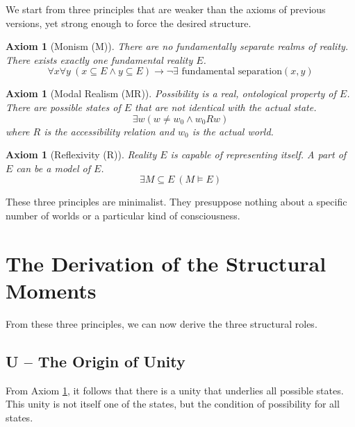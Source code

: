 \documentclass[12pt,a4paper]{article}
\newtheorem{axiom}[theorem]{Axiom}
\begin{document}
We start from three principles that are weaker than the axioms of previous versions, yet strong enough to force the desired structure.

\begin{axiom}[Monism (M)]
\label{ax:monism}
There are no fundamentally separate realms of reality. There exists exactly one fundamental reality \(E\).
\begin{equation}
\forall x \forall y \ (x \subseteq E \land y \subseteq E) \rightarrow \neg \exists \text{ fundamental separation}(x, y)
\end{equation}
\end{axiom}

\begin{axiom}[Modal Realism (MR)]
\label{ax:modalrealism}
Possibility is a real, ontological property of \(E\). There are possible states of \(E\) that are not identical with the actual state.
\begin{equation}
\exists w (w \neq w_0 \land w_0 R w)
\end{equation}
where \(R\) is the accessibility relation and \(w_0\) is the actual world.
\end{axiom}

\begin{axiom}[Reflexivity (R)]
\label{ax:reflexivity}
Reality \(E\) is capable of representing itself. A part of \(E\) can be a model of \(E\).
\begin{equation}
\exists M \subseteq E \ (M \models E)
\end{equation}
\end{axiom}

These three principles are minimalist. They presuppose nothing about a specific number of worlds or a particular kind of consciousness.

\section{The Derivation of the Structural Moments}

From these three principles, we can now derive the three structural roles.

\subsection{U – The Origin of Unity}

From Axiom \ref{ax:monism}, it follows that there is a unity that underlies all possible states. This unity is not itself one of the states, but the condition of possibility for all states.
\end{document}
